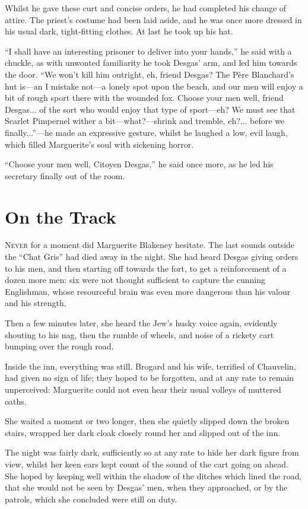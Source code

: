 \documentclass[paper=a5,BCOR=7mm,twoside,DIV=calc,12pt,usegeometry,chapterprefix,endperiod,headings=big]{scrbook}
\begin{document}
Whilst he gave these curt and concise orders, he had completed his change of attire. The priest's costume had been laid aside, and he was once more dressed in his usual dark, tight-fitting clothes. At last he took up his hat.

\enquote{I shall have an interesting prisoner to deliver into your hands,} he said with a chuckle, as with unwonted familiarity he took Desgas’ arm, and led him towards the door. \enquote{We won't kill him outright, eh, friend Desgas? The Père Blanchard's hut is---an I mistake not---a lonely spot upon the beach, and our men will enjoy a bit of rough sport there with the wounded fox. Choose your men well, friend Desgas... of the sort who would enjoy that type of sport---eh? We must see that Scarlet Pimpernel wither a bit---what?---shrink and tremble, eh?... before we finally...}---he made an expressive gesture, whilst he laughed a low, evil laugh, which filled Marguerite's soul with sickening horror.

\enquote{Choose your men well, Citoyen Desgas,} he said once more, as he led his secretary finally out of the room.

\chapter{On the Track}
\lettrine[lines=4]{N}{ever} for a moment did Marguerite Blakeney hesitate. The last sounds outside the \enquote{Chat Gris} had died away in the night. She had heard Desgas giving orders to his men, and then starting off towards the fort, to get a reinforcement of a dozen more men: six were not thought sufficient to capture the cunning Englishman, whose resourceful brain was even more dangerous than his valour and his strength.

Then a few minutes later, she heard the Jew's husky voice again, evidently shouting to his nag, then the rumble of wheels, and noise of a rickety cart bumping over the rough road.

Inside the inn, everything was still. Brogard and his wife, terrified of Chauvelin, had given no sign of life; they hoped to be forgotten, and at any rate to remain unperceived: Marguerite could not even hear their usual volleys of muttered oaths.

She waited a moment or two longer, then she quietly slipped down the broken stairs, wrapped her dark cloak closely round her and slipped out of the inn.

The night was fairly dark, sufficiently so at any rate to hide her dark figure from view, whilst her keen ears kept count of the sound of the cart going on ahead. She hoped by keeping well within the shadow of the ditches which lined the road, that she would not be seen by Desgas’ men, when they approached, or by the patrols, which she concluded were still on duty.
\end{document}
